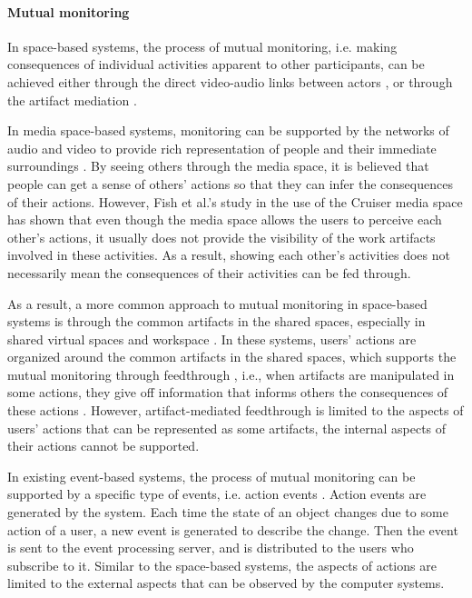 \paragraph*{Mutual monitoring} %
\label{par:mutual_monitoring}
In space-based systems, the process of mutual monitoring, i.e. making consequences of individual activities apparent to other participants, can be achieved either through the direct video-audio links between actors \cite{Dourish1992}, or through the artifact mediation \cite{Tee2009}. 

In media space-based systems, monitoring can be supported by the networks of audio and video to provide rich representation of people and their immediate surroundings \cite{Dourish1992}. By seeing others through the media space, it is believed that people can get a sense of others’ actions so that they can infer the consequences of their actions. However, Fish et al.’s study in the use of the Cruiser media space \cite{Fish1992} has shown that even though the media space allows the users to perceive each other's actions, it usually does not provide the visibility of the work artifacts involved in these activities. As a result, showing each other's activities does not necessarily mean the consequences of their activities can be fed through. 

As a result, a more common approach to mutual monitoring in space-based systems is through the common artifacts in the shared spaces, especially in shared virtual spaces and workspace \cite{Berlage1999}. In these systems, users' actions are organized around the common artifacts in the shared spaces, which supports the mutual monitoring through feedthrough \cite{dix1997challenges}, i.e., when artifacts are manipulated in some actions, they give off information that informs others the consequences of these actions \cite{Tee2009}. However, artifact-mediated feedthrough is limited to the aspects of users' actions that can be represented as some artifacts, the internal aspects of their actions cannot be supported.

In existing event-based systems, the process of mutual monitoring can be supported by a specific type of events, i.e. action events \cite{Fuchs1995}. Action events are generated by the system. Each time the state of an object changes due to some action of a user, a new event is generated to describe the change. Then the event is sent to the event processing server, and is distributed to the users who subscribe to it. Similar to the space-based systems, the aspects of actions are limited to the external aspects that can be observed by the computer systems.

